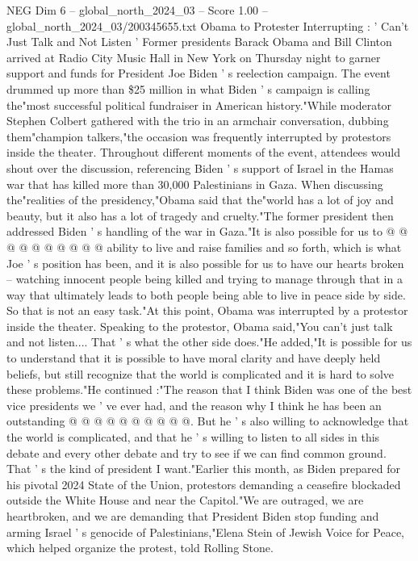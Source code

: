 \begin{textsample}{NEG Dim 6 – global\_north\_2024\_03 – Score 1.00 – global\_north\_2024\_03/200345655.txt}  \label{ex:f6_neg_402}
Obama to Protester Interrupting : ' Can't Just Talk and Not Listen ' Former presidents Barack Obama and Bill Clinton arrived at Radio City Music Hall in New York on Thursday night to garner support and funds for President Joe Biden ' s reelection campaign.
The event drummed up more than \$25 million in what Biden ' s campaign is calling the"most successful political fundraiser in American history."While moderator Stephen Colbert gathered with the trio in an armchair conversation, dubbing them"champion talkers,"the occasion was frequently interrupted by protestors inside the theater.
Throughout different moments of the event, attendees would shout over the discussion, referencing Biden ' s support of Israel in the Hamas war that has killed more than 30,000 Palestinians in Gaza.
When discussing the"realities of the presidency,"Obama said that the"world has a lot of joy and beauty, but it also has a lot of tragedy and cruelty."The former president then addressed Biden ' s handling of the war in Gaza."It is also possible for us to @ @ @ @ @ @ @ @ @ @ ability to live and raise families and so forth, which is what Joe ' s position has been, and it is also possible for us to have our hearts broken -- watching innocent people being killed and trying to manage through that in a way that ultimately leads to both people being able to live in peace side by side.
So that is not an easy task."At this point, Obama was interrupted by a protestor inside the theater.
Speaking to the protestor, Obama said,"You can't just talk and not listen....
That ' s what the other side does."He added,"It is possible for us to understand that it is possible to have moral clarity and have deeply held beliefs, but still recognize that the world is complicated and it is hard to solve these problems."He continued :"The reason that I think Biden was one of the best vice presidents we ' ve ever had, and the reason why I think he has been an outstanding @ @ @ @ @ @ @ @ @ @.
But he ' s also willing to acknowledge that the world is complicated, and that he ' s willing to listen to all sides in this debate and every other debate and try to see if we can find common ground.
That ' s the kind of president I want."Earlier this month, as Biden prepared for his pivotal 2024 State of the Union, protestors demanding a ceasefire blockaded outside the White House and near the Capitol."We are outraged, we are heartbroken, and we are demanding that President Biden stop funding and arming Israel ' s genocide of Palestinians,"Elena Stein of Jewish Voice for Peace, which helped organize the protest, told Rolling Stone.

\end{textsample}
